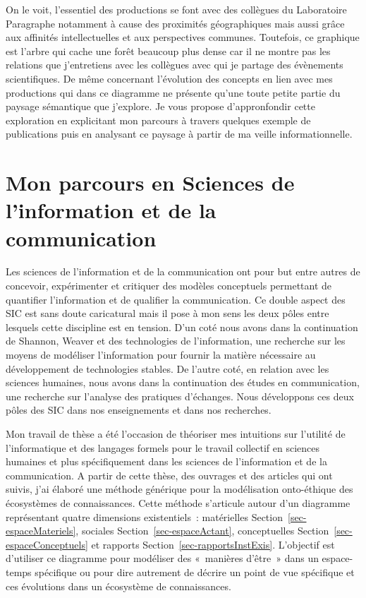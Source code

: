 \documentclass[
  a4paper,
  DIV=11,
  numbers=noendperiod]{scrreprt}
\begin{document}
On le voit, l'essentiel des productions se font avec des collègues du
Laboratoire Paragraphe notamment à cause des proximités géographiques
mais aussi grâce aux affinités intellectuelles et aux perspectives
communes. Toutefois, ce graphique est l'arbre qui cache une forêt
beaucoup plus dense car il ne montre pas les relations que j'entretiens
avec les collègues avec qui je partage des évènements scientifiques. De
même concernant l'évolution des concepts en lien avec mes productions
qui dans ce diagramme ne présente qu'une toute petite partie du paysage
sémantique que j'explore. Je vous propose d'appronfondir cette
exploration en explicitant mon parcours à travers quelques exemple de
publications puis en analysant ce paysage à partir de ma veille
informationnelle.

\section{Mon parcours en Sciences de l'information et de la
communication}\label{sec-posiSIC}

Les sciences de l'information et de la communication ont pour but entre
autres de concevoir, expérimenter et critiquer des modèles conceptuels
permettant de quantifier l'information et de qualifier la communication.
Ce double aspect des SIC est sans doute caricatural mais il pose à mon
sens les deux pôles entre lesquels cette discipline est en tension. D'un
coté nous avons dans la continuation de Shannon, Weaver et des
technologies de l'information, une recherche sur les moyens de modéliser
l'information pour fournir la matière nécessaire au développement de
technologies stables. De l'autre coté, en relation avec les sciences
humaines, nous avons dans la continuation des études en communication,
une recherche sur l'analyse des pratiques d'échanges. Nous développons
ces deux pôles des SIC dans nos enseignements et dans nos recherches.

Mon travail de thèse a été l'occasion de théoriser mes intuitions sur
l'utilité de l'informatique et des langages formels pour le travail
collectif en sciences humaines et plus spécifiquement dans les sciences
de l'information et de la communication. A partir de cette thèse, des
ouvrages et des articles qui ont suivis, j'ai élaboré une méthode
générique pour la modélisation onto-éthique des écosystèmes de
connaissances. Cette méthode s'articule autour d'un diagramme
représentant quatre dimensions existentiels~: matérielles
Section~\ref{sec-espaceMateriels}, sociales
Section~\ref{sec-espaceActant}, conceptuelles
Section~\ref{sec-espaceConceptuels} et rapports
Section~\ref{sec-rapportsInstExis}. L'objectif est d'utiliser ce
diagramme pour modéliser des «~manières d'être~» dans un espace-temps
spécifique ou pour dire autrement de décrire un point de vue spécifique
et ces évolutions dans un écosystème de connaissances.
\end{document}
